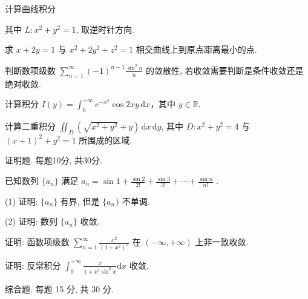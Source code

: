 计算曲线积分\par
\nopagebreak[4]
其中 $L: x^{2} + y^{2} = 1$, 取逆时针方向.\par
求 $x + 2y = 1$ 与 $x^{2} + 2y^{2} + z^{2} = 1$ 相交曲线上到原点距离最小的点.\par
判断数项级数 $\sum_{n=1}^{\infty} (-1)^{n-1} \frac{\sin^2 n}{n}$ 的敛散性, 若收敛需要判断是条件收敛还是绝对收敛.\par
计算积分 $I(y) = \int_{0}^{+\infty} e^{-x^2} \cos 2xy \, \mathrm{d}x$，其中 $y \in \mathbb{R}$.\par
计算二重积分 $\iint_{D} (\sqrt{x^2 + y^2} + y) \, \mathrm{d}x \, \mathrm{d}y$, 其中 $D: x^2 + y^2 = 4$ 与 $(x + 1)^2 + y^2 = 1$ 所围成的区域.\par
\par{}
证明题. 每题10分, 共30分.\par
已知数列  $\{a_{n}\}$  满足  $a_{n}=\sin1+\frac{\sin2}{2!}+\frac{\sin3}{3!}+\cdots+\frac{\sin n}{n!}$ .\par
(1) 证明: $\{a_{n}\}$ 有界, 但是 $\{a_{n}\}$ 不单调.\par
(2) 证明: 数列 $\{a_{n}\}$ 收敛.\par
证明: 函数项级数 $\sum_{n=1}^{\infty} \frac{x^{2}}{(1 + x^{2})^{n}}$ 在 $(- \infty, +\infty)$ 上非一致收敛.\par
证明: 反常积分 $\int_{0}^{+\infty} \frac{x}{1 + x^{5} \sin^{2} x} \mathrm{d}x$ 收敛.\par
\par{}
综合题. 每题 15 分, 共 30 分.\par
